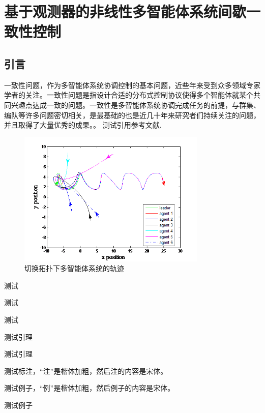 \chapter{基于观测器的非线性多智能体系统间歇一致性控制}
\section{引言}
一致性问题，作为多智能体系统协调控制的基本问题，近些年来受到众多领域专家学者的关注。一致性问题是指设计合适的分布式控制协议使得多个智能体就某个共同兴趣点达成一致的问题。一致性是多智能体系统协调完成任务的前提，与群集、编队等许多问题密切相关，是最基础的也是近几十年来研究者们持续关注的问题，并且取得了大量优秀的成果。。
测试引用参考文献\cite{ran2007comprehensive}.
\begin{figure}[!htbp]%
\centering
\includegraphics[width=0.8\textwidth]{5.png}
\caption{切换拓扑下多智能体系统的轨迹}
\end{figure}
\begin{Theorem}
测试
\end{Theorem}
\begin{Theorem}
测试
\end{Theorem}
\begin{Theorem}
测试
\end{Theorem}
\begin{Lemma}
测试引理
\end{Lemma}
\begin{Lemma}
测试引理
\end{Lemma}
\begin{Remark}
测试标注，“注”是楷体加粗，然后注的内容是宋体。
\end{Remark}
\setcounter{Theorem}{0}
\begin{Example}
测试例子，“例”是楷体加粗，然后例子的内容是宋体。
\end{Example}
\begin{Example}
测试例子
\end{Example}
